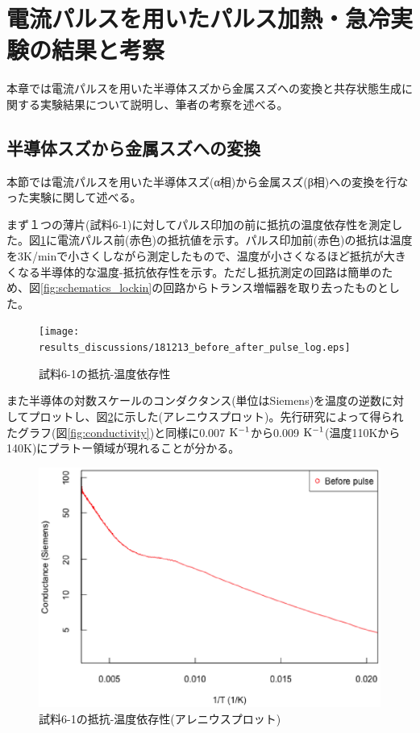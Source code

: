 \section{電流パルスを用いたパルス加熱・急冷実験の結果と考察}
本章では電流パルスを用いた半導体スズから金属スズへの変換と共存状態生成に関する実験結果について説明し、筆者の考察を述べる。

\subsection{半導体スズから金属スズへの変換}
本節では電流パルスを用いた半導体スズ(α相)から金属スズ(β相)への変換を行なった実験に関して述べる。

まず１つの薄片(試料6-1)に対してパルス印加の前に抵抗の温度依存性を測定した。図\ref{fig:181213_before_after_pulse_log}に電流パルス前(赤色)の抵抗値を示す。パルス印加前(赤色)の抵抗は温度を3K/minで小さくしながら測定したもので、温度が小さくなるほど抵抗が大きくなる半導体的な温度-抵抗依存性を示す。ただし抵抗測定の回路は簡単のため、図\ref{fig:schematics_lockin}の回路からトランス増幅器を取り去ったものとした。
\begin{figure}[!h]
    \begin{center}
   \texttt{[image: results\_discussions/181213\_before\_after\_pulse\_log.eps]}
  \end{center}
  \caption{試料6-1の抵抗-温度依存性}
  \label{fig:181213_before_after_pulse_log}
  \end{figure}
  
また半導体の対数スケールのコンダクタンス(単位はSiemens)を温度の逆数に対してプロットし、図\ref{fig:181213_before_pulse_Tinv}に示した(アレニウスプロット)。先行研究\cite{Kohnke}によって得られたグラフ(図\ref{fig:conductivity})と同様に0.007 $\rm  K^{-1}$から0.009 $\rm  K^{-1}$(温度110Kから140K)にプラトー領域が現れることが分かる。
\begin{figure}[!h]
    \begin{center}
   \includegraphics[width=0.8\hsize]{results_discussions/181213_before_pulse_Tinv.eps}
  \end{center}
  \caption{試料6-1の抵抗-温度依存性(アレニウスプロット)}
  \label{fig:181213_before_pulse_Tinv}
  \end{figure}

